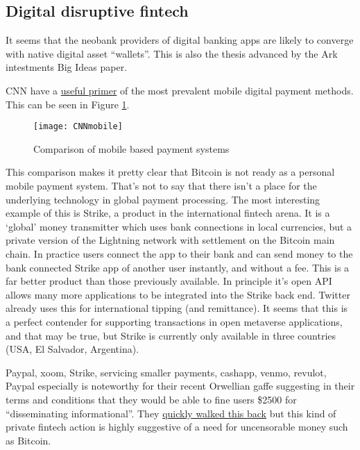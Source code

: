 \subsection{Digital disruptive fintech}
It seems that the neobank providers of digital banking apps are likely to converge with native digital asset ``wallets''. This is also the thesis advanced by the Ark intestments Big Ideas paper.\par
CNN have a \href{https://money.cnn.com/infographic/technology/mobile-payment-comparison/index.html}{useful primer} of the most prevalent mobile digital payment methods. This can be seen in Figure \ref{fig:CNNmobile}.
\begin{figure}
  \centering
    \texttt{[image: CNNmobile]}
  \caption{Comparison of mobile based payment systems}
  \label{fig:CNNmobile}
\end{figure}
This comparison makes it pretty clear that Bitcoin is not ready as a personal mobile payment system. That's not to say that there isn't a place for the underlying technology in global payment processing. 
The most interesting example of this is Strike, a product in the international fintech arena. It is a `global' money transmitter which uses bank connections in local currencies, but a private version of the Lightning network with settlement on the Bitcoin main chain. In practice users connect the app to their bank and can send money to the bank connected Strike app of another user instantly, and without a fee. This is a far better product than those previously available. In principle it's open API allows many more applications to be integrated into the Strike back end. Twitter already uses this for international tipping (and remittance). It seems that this is a perfect contender for supporting transactions in open metaverse applications, and that may be true, but Strike is currently only available in three countries (USA, El Salvador, Argentina).\par
Paypal, xoom, Strike, servicing smaller payments, cashapp, venmo, revulot, 
Paypal especially is noteworthy for their recent Orwellian gaffe suggesting in their terms and conditions that they would be able to fine users \$2500 for ``disseminating informational''. They \href{https://www.yahoo.com/video/paypal-policy-permits-company-fine-143946902.html}{quickly walked this back} but this kind of private fintech action is highly suggestive of a need for uncensorable money such as Bitcoin.
